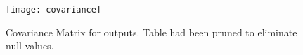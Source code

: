 \documentclass[]{article}
\begin{document}
\begin{figure}[H]
	\begin{center}
		\caption[Covariance Matrix for outputs]{Covariance Matrix for outputs. Table had been pruned to eliminate null values.}
		\texttt{[image: covariance]}
	\end{center}
\end{figure}



\end{document}
